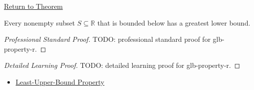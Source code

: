 \newpage
{}
\label{prf:glb-property-r}

\begin{remark*}[Return]
\hyperref[cor:glb-property-r]{Return to Theorem}
\end{remark*}

\begin{corollary*}
Every nonempty subset $S\subseteq\mathbb{R}$ that is bounded below has a
greatest lower bound.
\end{corollary*}

\begin{proof}[Professional Standard Proof]
\LRAProofBodyStart
TODO: professional standard proof for glb-property-r.
\end{proof}

\begin{proof}[Detailed Learning Proof]
\LRAProofBodyStart
TODO: detailed learning proof for glb-property-r.
\end{proof}

\begin{remark*}
\end{remark*}

\begin{dependencies}
\begin{itemize}
  \item \hyperref[thm:lub-property-r]{Least-Upper-Bound Property}
\end{itemize}
\end{dependencies}

\clearpage
